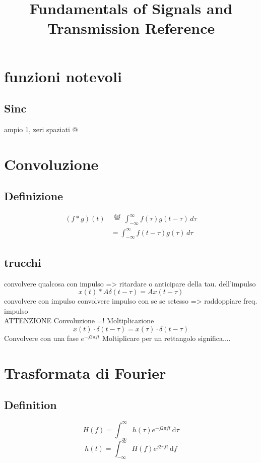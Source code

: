 \documentclass[12pt,a4paper,]{article}
\title{Fundamentals of Signals and Transmission Reference}
\date{}
\author{}
\begin{document}
\maketitle
\section{funzioni notevoli}
\subsection{Sinc}
ampio 1, zeri spaziati @ 
\section{Convoluzione}
\subsection{Definizione}

\begin{align}
(f * g )(t) & \, \stackrel{\mathrm{def}}{=}\ \int_{-\infty}^\infty f(\tau) g(t - \tau) \, d\tau \\
& = \int_{-\infty}^\infty f(t-\tau) g(\tau)\, d\tau
\end{align}
\subsection{trucchi}
convolvere qualcosa con impulso => ritardare o anticipare della tau. dell'impulso\\
\begin{equation}
x(t) \ast A \delta(t-\tau) = Ax(t-\tau)
\end{equation}
convolvere con impulso 
convolvere impulso con se se setesso => raddoppiare freq. impulso \\
ATTENZIONE Convoluzione =! Moltiplicazione
\begin{equation}
x(t)\cdot\delta(t-\tau) = x(\tau)\cdot\delta(t-\tau)
\end{equation}
Convolvere con una fase $e^{-j2\pi f t}$
Moltiplicare per un rettangolo significa....
\section{Trasformata di Fourier}
\subsection{Definition}
\begin{equation}
H(f) = \int_{-\infty}^{\infty} \! h(\tau) e^{-j2\pi ft} \, \mathrm{d}\tau
\end{equation}
\begin{equation}
h(t) = \int_{-\infty}^{\infty} \! H(f) e^{j2\pi ft} \, \mathrm{d}f
\end{equation}
\end{document}

